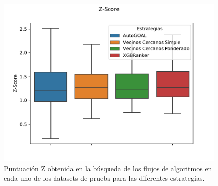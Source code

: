 \documentclass[a4paper,12pt]{article}
\begin{document}
\begin{figure}[htb]
	\centering
	\includegraphics[scale=.8]{Figures/z-score.pdf}
	\caption{Puntuación Z obtenida en la búsqueda de los flujos de algoritmos en cada uno de los datasets de prueba para las diferentes estrategias.}
	\label{fig:zscore}
\end{figure}


\end{document}
